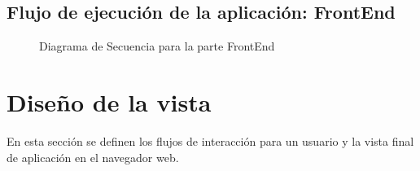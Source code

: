 \begin{minipage}{\linewidth}
\subsection{Flujo de ejecución de la aplicación: FrontEnd}
\begin{figure}[H]
\caption{Diagrama de Secuencia para la parte FrontEnd}
\end{figure}
\end{minipage}
\newpage
\section{Diseño de la vista}
En esta sección se definen los flujos de interacción para un usuario y la vista final de aplicación en el navegador web.\\


